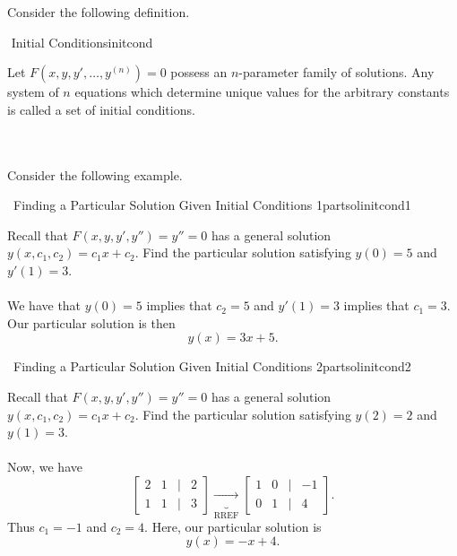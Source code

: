         Consider the following definition.
        \begin{definition}{\Stop\,\,Initial Conditions}{initcond}

            Let \(F(x,y,y',\ldots,y^{(n)})=0\) possess an \(n\)-parameter family of solutions. Any system of \(n\) equations which determine unique values for the arbitrary constants is called a set of initial conditions.
            
        \end{definition}
        \vphantom
        \\
        \\
        Consider the following example.
        \begin{example}{\Difficulty\,\Difficulty\,\,Finding a Particular Solution Given Initial Conditions 1}{partsolinitcond1}

            Recall that \(F(x,y,y',y'')=y''=0\) has a general solution \(y(x,c_1,c_2)=c_1x+c_2\). Find the particular solution satisfying \(y(0)=5\) and \(y'(1)=3\).
            \\
            \\
            We have that \(y(0)=5\) implies that \(c_2=5\) and \(y'(1)=3\) implies that \(c_1=3\). Our particular solution is then
            \begin{equation*}
                y(x)=3x+5.
            \end{equation*}
            
        \end{example}
        \begin{example}{\Difficulty\,\Difficulty\,\,Finding a Particular Solution Given Initial Conditions 2}{partsolinitcond2}

            Recall that \(F(x,y,y',y'')=y''=0\) has a general solution \(y(x,c_1,c_2)=c_1x+c_2\). Find the particular solution satisfying \(y(2)=2\) and \(y(1)=3\).
            \\
            \\
            Now, we have
            \begin{equation*}
                \begin{bmatrix}
                    2 & 1 & | & 2 \\
                    1 & 1 & | & 3
                \end{bmatrix}\underbrace{\to}_{\text{RREF}}\begin{bmatrix}
                    1 & 0 & | & -1 \\
                    0 & 1 & | & 4 
                \end{bmatrix}.
            \end{equation*}
            Thus \(c_1=-1\) and \(c_2=4\). Here, our particular solution is
            \begin{equation*}
                y(x)=-x+4.
            \end{equation*}
            
        \end{example}

